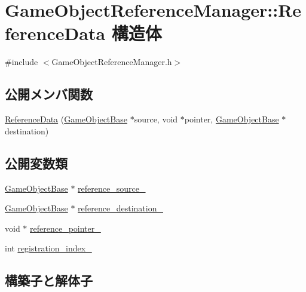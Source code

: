 \hypertarget{struct_game_object_reference_manager_1_1_reference_data}{}\section{Game\+Object\+Reference\+Manager\+:\+:Reference\+Data 構造体}
\label{struct_game_object_reference_manager_1_1_reference_data}


{\ttfamily \#include $<$Game\+Object\+Reference\+Manager.\+h$>$}

\subsection*{公開メンバ関数}
\begin{DoxyCompactItemize}
\item 
\mbox{\hyperlink{struct_game_object_reference_manager_1_1_reference_data_a3f1746e9c2998734776132c3734a69ae}{Reference\+Data}} (\mbox{\hyperlink{class_game_object_base}{Game\+Object\+Base}} $\ast$source, void $\ast$pointer, \mbox{\hyperlink{class_game_object_base}{Game\+Object\+Base}} $\ast$destination)
\end{DoxyCompactItemize}
\subsection*{公開変数類}
\begin{DoxyCompactItemize}
\item 
\mbox{\hyperlink{class_game_object_base}{Game\+Object\+Base}} $\ast$ \mbox{\hyperlink{struct_game_object_reference_manager_1_1_reference_data_a3a949f29b8484e8c9498a78e0c936ac4}{reference\+\_\+source\+\_\+}}
\item 
\mbox{\hyperlink{class_game_object_base}{Game\+Object\+Base}} $\ast$ \mbox{\hyperlink{struct_game_object_reference_manager_1_1_reference_data_af5d72ac9856b14efb3eee47d4c6db72a}{reference\+\_\+destination\+\_\+}}
\item 
void $\ast$ \mbox{\hyperlink{struct_game_object_reference_manager_1_1_reference_data_a360dfcbaa8421065a9d3b9d963ed576b}{reference\+\_\+pointer\+\_\+}}
\item 
int \mbox{\hyperlink{struct_game_object_reference_manager_1_1_reference_data_a36154b84fbcaa168786a74854cfda609}{registration\+\_\+index\+\_\+}}
\end{DoxyCompactItemize}


\subsection{構築子と解体子}
\mbox{\label{struct_game_object_reference_manager_1_1_reference_data_a3f1746e9c2998734776132c3734a69ae}} 
